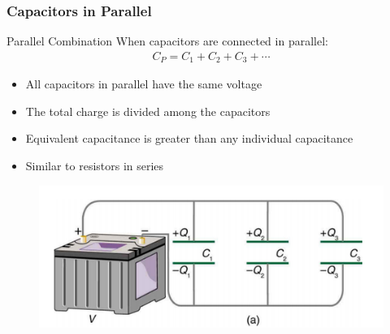 \documentclass{beamer}
\begin{document}
\begin{frame}
    \frametitle{Capacitors in Parallel}
    
    \begin{block}{Parallel Combination}
        When capacitors are connected in parallel:
        \begin{align}
            C_P = C_1 + C_2 + C_3 + \cdots
        \end{align}
    \end{block}
    
    \begin{itemize}
        \item All capacitors in parallel have the same voltage
        \item The total charge is divided among the capacitors
        \item Equivalent capacitance is greater than any individual capacitance
        \item Similar to resistors in series
    \end{itemize}
    
    \begin{center}
   
      \begin{figure}
          \centering
          \includegraphics[width=0.5\linewidth]{paralelcap.png}
      \end{figure}
    \end{center}
\end{frame}
\end{document}
